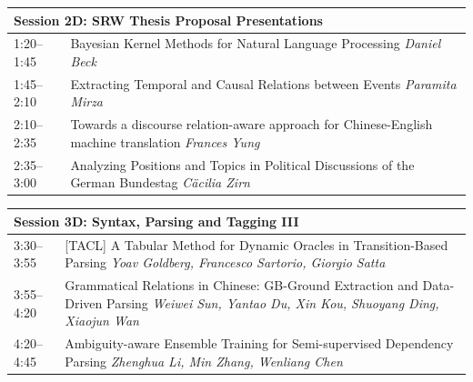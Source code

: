 \documentclass{book}
\renewcommand{\large}{\fontsize{36}{40}\selectfont}
\begin{document}
\begin{tabular}{p{3in}p{16in}}
  \multicolumn{2}{l}{\bfseries\large Session 2D: SRW Thesis Proposal Presentations} \\\hline

    
    1:20--1:45
    &	Bayesian Kernel Methods for Natural Language Processing \newline 
    {\itshape Daniel Beck} \\
    
    1:45--2:10
    &	Extracting Temporal and Causal Relations between Events \newline 
    {\itshape Paramita Mirza} \\
    
    2:10--2:35
    &	Towards a discourse relation-aware approach for Chinese-English machine translation \newline 
    {\itshape Frances Yung} \\
    
    2:35--3:00
    &	Analyzing Positions and Topics in Political Discussions of the German Bundestag \newline 
    {\itshape Cäcilia Zirn} \\
    
\end{tabular}

\begin{tabular}{p{3in}p{16in}}
  \multicolumn{2}{l}{\bfseries\large Session 3D: Syntax, Parsing and Tagging III} \\\hline

    
    3:30--3:55
    &	[TACL] A Tabular Method for Dynamic Oracles in Transition-Based Parsing \newline 
    {\itshape Yoav Goldberg, Francesco Sartorio, Giorgio Satta} \\
    
    3:55--4:20
    &	Grammatical Relations in Chinese: GB-Ground Extraction and Data-Driven Parsing \newline 
    {\itshape Weiwei Sun, Yantao Du, Xin Kou, Shuoyang Ding, Xiaojun Wan} \\
    
    4:20--4:45
    &	Ambiguity-aware Ensemble Training for Semi-supervised Dependency Parsing \newline 
    {\itshape Zhenghua Li, Min Zhang, Wenliang Chen} \\
    
\end{tabular}
\end{document}
